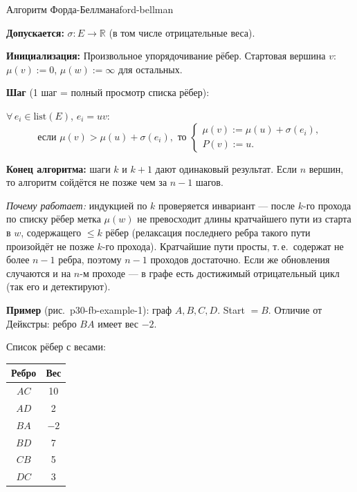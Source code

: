 
\begin{algo}{Алгоритм Форда-Беллмана}{ford-bellman}

\textbf{Допускается:} $\sigma\colon E \to \mathbb{R}$ (в том числе отрицательные веса).

\textbf{Инициализация:}
Произвольное упорядочивание рёбер. Стартовая вершина $v$: $\mu(v) := 0$, $\mu(w) := \infty$ для остальных.

\textbf{Шаг} (1 шаг = полный просмотр списка рёбер):

$\forall\, e_i \in \mathrm{list}(E)$, $e_i = uv$:
\[
  \text{если } \mu(v) > \mu(u) + \sigma(e_i), \text{ то }
  \begin{cases}
    \mu(v) := \mu(u) + \sigma(e_i), \\
    P(v) := u.
  \end{cases}
\]

\textbf{Конец алгоритма:} шаги $k$ и $k+1$ дают одинаковый результат. Если $n$ вершин, то алгоритм сойдётся не позже чем за $n - 1$ шагов.

\textit{Почему работает:} индукцией по $k$ проверяется инвариант ---
после $k$-го прохода по списку рёбер метка $\mu(w)$ не превосходит длины
кратчайшего пути из старта в $w$, содержащего $\le k$ рёбер (релаксация
последнего ребра такого пути произойдёт не позже $k$-го прохода).
Кратчайшие пути просты, т.\,е.\ содержат не более $n - 1$ ребра, поэтому
$n - 1$ проходов достаточно. Если же обновления случаются и на $n$-м
проходе --- в графе есть достижимый отрицательный цикл (так его и
детектируют).

\textbf{Пример} (рис.~p30-fb-example-1): граф $A, B, C, D$. Start $= B$. Отличие от Дейкстры: ребро $BA$ имеет вес $-2$.


Список рёбер с весами:
\begin{center}
\begin{tabular}{cc}
Ребро & Вес \\
\hline
$AC$ & 10 \\
$AD$ & 2 \\
$BA$ & $-2$ \\
$BD$ & 7 \\
$CB$ & 5 \\
$DC$ & 3 \\
\end{tabular}
\end{center}


\end{algo}
